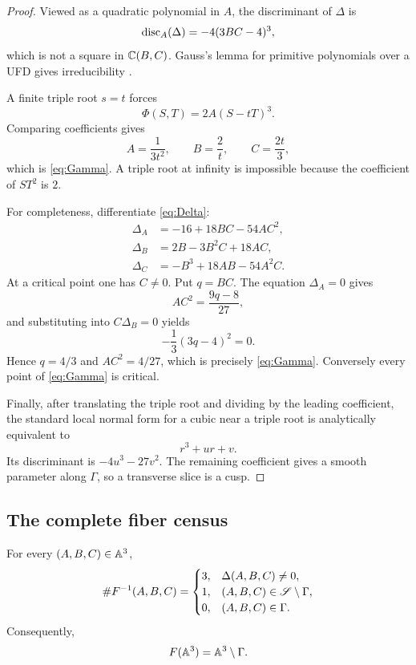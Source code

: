 \begin{proof}
Viewed as a quadratic polynomial in $A$, the discriminant of $\Delta$ is
\[
  \operatorname{disc}_A(\Delta)=-4(3BC-4)^3,
\]
which is not a square in $\mathbb C(B,C)$.  Gauss's lemma for primitive polynomials over a UFD gives irreducibility \cite[Chapter 1]{Eisenbud1995}.

A finite triple root $s=t$ forces
\[
  \Phi(S,T)=2A(S-tT)^3.
\]
Comparing coefficients gives
\[
  A=\frac1{3t^2},
  \qquad B=\frac2t,
  \qquad C=\frac{2t}{3},
\]
which is \eqref{eq:Gamma}.  A triple root at infinity is impossible because the coefficient of $ST^2$ is $2$.

For completeness, differentiate \eqref{eq:Delta}:
\[
\begin{aligned}
  \Delta_A&=-16+18BC-54AC^2,\\
  \Delta_B&=2B-3B^2C+18AC,\\
  \Delta_C&=-B^3+18AB-54A^2C.
\end{aligned}
\]
At a critical point one has $C\neq0$.  Put $q=BC$.  The equation $\Delta_A=0$ gives
\[
  AC^2=\frac{9q-8}{27},
\]
and substituting into $C\Delta_B=0$ yields
\[
  -\frac13(3q-4)^2=0.
\]
Hence $q=4/3$ and $AC^2=4/27$, which is precisely \eqref{eq:Gamma}.  Conversely every point of \eqref{eq:Gamma} is critical.

Finally, after translating the triple root and dividing by the leading coefficient, the standard local normal form for a cubic near a triple root \cite[Chapter 1]{GKZ1994} is analytically equivalent to
\[
  r^3+ur+v.
\]
Its discriminant is $-4u^3-27v^2$.  The remaining coefficient gives a smooth parameter along $\Gamma$, so a transverse slice is a cusp.
\end{proof}

\subsection{The complete fiber census}

\begin{theorem}\label{thm:fiber-census}
For every $(A,B,C)\in\mathbb A^3$,
\[
  \#F^{-1}(A,B,C)=
  \begin{cases}
    3,&\Delta(A,B,C)\neq0,\\
    1,&(A,B,C)\in\mathscr S\setminus\Gamma,\\
    0,&(A,B,C)\in\Gamma.
  \end{cases}
\]
Consequently,
\[
  F(\mathbb A^3)=\mathbb A^3\setminus\Gamma.
\]
\end{theorem}


